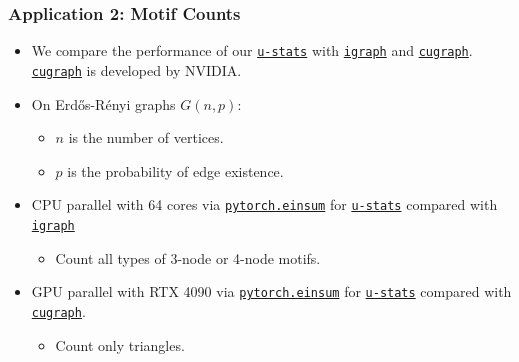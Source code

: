 \documentclass[9pt]{beamer}
\theoremstyle{mystyle}
\theoremstyle{mystyletwo}
\newcommand{\libref}[2]{\href{#2}{\texttt{#1}}}
\newcommand{\cugraph}{\libref{cugraph}{https://docs.rapids.ai/api/cugraph/legacy/api_docs/api/cugraph/cugraph.triangle_count/}}
\def\package{\libref{u-stats}{https://github.com/Amedar-Asterisk/U-Statistics-python}}
\newcommand{\torcheinsum}{\libref{pytorch.einsum}{https://pytorch.org/docs/stable/generated/torch.einsum.html}}
\newcommand{\igraph}{\libref{igraph}{https://igraph.org/}}
\begin{document}
\begin{frame}
    \frametitle{Application 2: Motif Counts}
    \begin{itemize}
    \setlength\itemsep{1.5em}
        \item We compare the performance of our \package{} with  \igraph{} and \cugraph{}. \cugraph{} is developed by NVIDIA.
        \item On Erdős-Rényi graphs $G(n, p)$:
            \begin{itemize}
            \setlength\itemsep{1.5em}
                \item $n$ is the number of vertices. 
                \item $p$ is the probability of edge existence. 

            \end{itemize}

         \item  CPU parallel with 64 cores via \torcheinsum{} for \package{} compared with \igraph{}  
        \begin{itemize}
            \setlength\itemsep{1.5em}
            \item Count all types of 3-node or 4-node motifs.
        \end{itemize}
        \item GPU parallel with RTX 4090 via \torcheinsum{} for \package{} compared with \cugraph{}.   
                \begin{itemize}
            \setlength\itemsep{1.5em}
             \item Count only triangles.
            \end{itemize}
    \end{itemize}
\end{frame}
\end{document}
